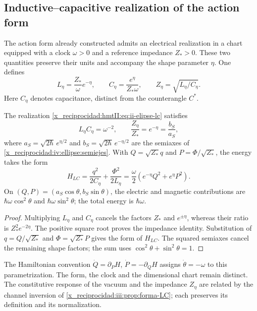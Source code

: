 \subsection{Inductive--capacitive realization of the action form}
\label{x_reciprocidad:nuclear:realizacion-lc}

The action form already constructed admits an electrical realization in
a chart equipped with a clock \(\omega>0\) and a reference
impedance \(Z_*>0\). These two quantities preserve their units and
accompany the shape parameter \(\eta\). One defines
\begin{equation}
 L_\eta=\frac{Z_*}{\omega}e^{-\eta},\qquad
 C_\eta=\frac{e^\eta}{Z_*\omega},\qquad
 Z_\eta=\sqrt{L_\eta/C_\eta}.
 \label{x_reciprocidad:hmtII:eq:ii-elipse-lc}
\end{equation}
Here \(C_\eta\) denotes capacitance, distinct from the counterangle \(C^*\).

\begin{proposition}
\label{x_reciprocidad:nuclear:lc-producto}
The realization \eqref{x_reciprocidad:hmtII:eq:ii-elipse-lc} satisfies
\begin{equation}
 L_\eta C_\eta=\omega^{-2},\qquad
 \frac{Z_\eta}{Z_*}=e^{-\eta}=\frac{b_S}{a_S},
 \label{x_reciprocidad:hmtII:eq:ii-elipse-impedancia}
\end{equation}
where \(a_S=\sqrt{2\hbar}\,e^{\eta/2}\) and
\(b_S=\sqrt{2\hbar}\,e^{-\eta/2}\) are the semiaxes of
\cref{x_reciprocidad:iv:ellipse:semiejes}.
With \(Q=\sqrt{Z_*}q\) and \(P=\Phi/\sqrt{Z_*}\), the energy takes the form
\[
 H_{LC}=\frac{q^2}{2C_\eta}+\frac{\Phi^2}{2L_\eta}
       =\frac\omega2(e^{-\eta}Q^2+e^\eta P^2).
\]
On \((Q,P)=(a_S\cos\theta,b_S\sin\theta)\), the electric
and magnetic contributions are \(\hbar\omega\cos^2\theta\) and
\(\hbar\omega\sin^2\theta\); the total energy is \(\hbar\omega\).
\end{proposition}
\begin{proof}
Multiplying \(L_\eta\) and \(C_\eta\) cancels the factors
\(Z_*\) and \(e^{\pm\eta}\), whereas their ratio is
\(Z_*^2e^{-2\eta}\). The positive square root proves the impedance identity.
Substitution of \(q=Q/\sqrt{Z_*}\) and \(\Phi=\sqrt{Z_*}P\) gives the form
of \(H_{LC}\). The squared semiaxes cancel the remaining shape
factors; the sum uses \(\cos^2\theta+\sin^2\theta=1\).
\end{proof}

The Hamiltonian convention
\(\dot Q=\partial_PH\), \(\dot P=-\partial_QH\) assigns
\(\dot\theta=-\omega\) to this parametrization. The form, the clock
and the dimensional chart remain distinct. The constitutive
response of the vacuum and the impedance \(Z_\eta\) are related
by the channel inversion of \cref{x_reciprocidad:iii:prop:forma-LC}; each
preserves its definition and its normalization.
